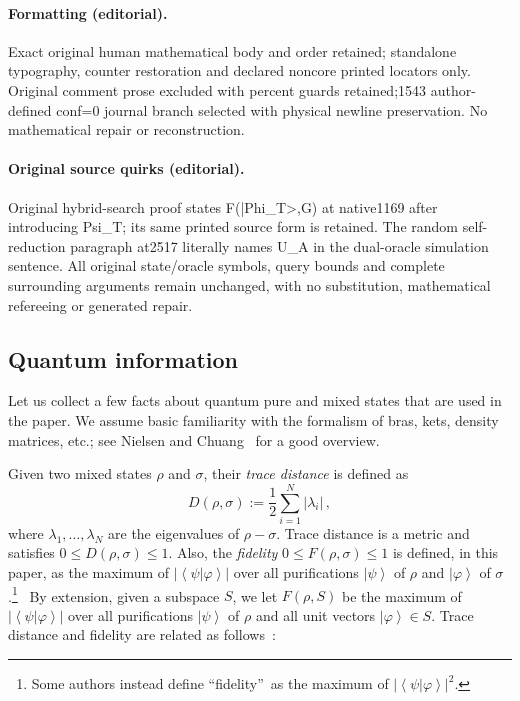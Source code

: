 \documentclass[10pt]{article}
\theoremstyle{definition}
\numberwithin{equation}{section}
\begin{document}
\paragraph{Formatting (editorial).} Exact original human mathematical body and order retained; standalone typography, counter restoration and declared noncore printed locators only. Original comment prose excluded with percent guards retained;1543 author-defined conf=0 journal branch selected with physical newline preservation. No mathematical repair or reconstruction.
\paragraph{Original source quirks (editorial).} Original hybrid-search proof states F(|Phi\_T>,G) at native1169 after introducing Psi\_T; its same printed source form is retained. The random self-reduction paragraph at2517 literally names U\_A in the dual-oracle simulation sentence. All original state/oracle symbols, query bounds and complete surrounding arguments remain unchanged, with no substitution, mathematical refereeing or generated repair.
\endgroup
\clearpage
\setcounter{section}{2}\setcounter{subsection}{1}\setcounter{theorem}{3}
\subsection{Quantum information\label{QI}}

Let us collect a few facts about quantum pure and mixed states that are used
in the paper. We assume basic familiarity with the formalism of bras, kets,
density matrices, etc.; see Nielsen and Chuang~\cite{nc} for a good overview.

Given two mixed states $\rho$ and $\sigma$, their \emph{trace distance} is
defined as 
\[
D\left(  \rho,\sigma\right)  :=\frac{1}{2}\sum_{i=1}^{N}\left\vert
\lambda_{i}\right\vert\,,
\]
where $\lambda_{1},\ldots,\lambda_{N}$ are the
eigenvalues of $\rho-\sigma$. Trace distance is a metric and satisfies
$0\leq D\left(  \rho,\sigma\right)  \leq1$. Also, the \emph{fidelity}
$0\leq F\left(  \rho,\sigma\right)  \leq1$ is defined, in this paper, as the
maximum of $\left\vert \left\langle \psi|\varphi\right\rangle \right\vert
$ over all purifications $\left\vert \psi\right\rangle $ of $\rho$ and
$\left\vert \varphi\right\rangle $ of $\sigma$.\footnote{Some authors instead
define \textquotedblleft fidelity\textquotedblright\ as the maximum of
$\left\vert \left\langle \psi|\varphi\right\rangle \right\vert ^{2}$.} \ By
extension, given a subspace $S$, we let $F\left(  \rho,S\right)  $ be the
maximum of $\left\vert \left\langle \psi|\varphi\right\rangle \right\vert
$ over all purifications $\left\vert \psi\right\rangle $ of $\rho$ and all
unit vectors $\left\vert \varphi\right\rangle \in S$. Trace distance and
fidelity are related as follows~\cite{nc}:
\end{document}
